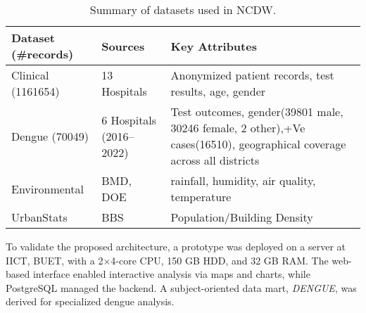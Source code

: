 \begin{table}[]
    \centering
    \caption{Summary of datasets used in NCDW.}
    \label{tab:datasets_summary}
    \begin{tabular}{p{1.5cm}p{1.5cm}p{4cm}}
        \toprule
         \textbf{Dataset (\#records)}         & \textbf{Sources}              & \textbf{Key Attributes}  \\
         \hline
         Clinical (1161654)       & 13 Hospitals           & Anonymized patient records, test results, age, gender \\
         \hline
         Dengue\hspace{0.5cm}  (70049)          & 6 Hospitals (2016–2022)       & Test outcomes, gender(39801 male, 30246 female, 2 other),+Ve cases(16510), geographical coverage across all districts \\ 
         \hline
         Environmental &  BMD, DOE & rainfall, humidity, air quality, temperature\\ 
         \hline
         UrbanStats        & BBS &Population/Building Density \\
         \bottomrule
    \end{tabular}
\end{table}

To validate the proposed architecture, a prototype was deployed on a server at IICT, BUET, with a 2×4-core CPU, 150 GB HDD, and 32 GB RAM. The web-based interface enabled interactive analysis via maps and charts, while PostgreSQL managed the backend. A subject-oriented data mart, \emph{DENGUE}, was derived for specialized dengue analysis.





